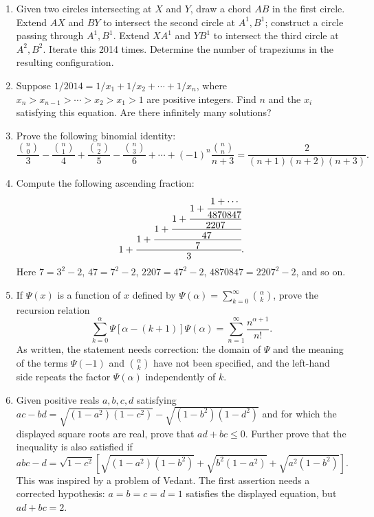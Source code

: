 \documentclass[11pt,a4paper]{article}
\begin{document}
\begin{enumerate}[label=\textbf{\arabic*.},itemsep=.75em]
\item Given two circles intersecting at $X$ and $Y$, draw a chord $AB$ in the first
circle. Extend $AX$ and $BY$ to intersect the second circle at $A^1,B^1$; construct a
circle passing through $A^1,B^1$. Extend $XA^1$ and $YB^1$ to intersect the third
circle at $A^2,B^2$. Iterate this 2014 times. Determine the number of trapeziums
in the resulting configuration.

\item Suppose $1/2014=1/x_1+1/x_2+\cdots+1/x_n$, where
$x_n>x_{n-1}>\cdots>x_2>x_1>1$ are positive integers. Find $n$ and the $x_i$ satisfying
this equation. Are there infinitely many solutions?

\item Prove the following binomial identity:
\[
\frac{\binom n0}{3}-\frac{\binom n1}{4}+\frac{\binom n2}{5}
-\frac{\binom n3}{6}+\cdots+(-1)^n\frac{\binom nn}{n+3}
=\frac2{(n+1)(n+2)(n+3)}.
\]

\item Compute the following ascending fraction:
\[
1+\cfrac{1+\cfrac{1+\cfrac{1+\cfrac{1+\cfrac{1+\cdots}{4870847}}{2207}}{47}}{7}}{3}.
\]
Here $7=3^2-2$, $47=7^2-2$, $2207=47^2-2$, $4870847=2207^2-2$, and so on.

\item If $\Psi(x)$ is a function of $x$ defined by
$\Psi(\alpha)=\sum_{k=0}^{\infty}\binom\alpha k$, prove the recursion relation
\[
\sum_{k=0}^{\alpha}\Psi[\alpha-(k+1)]\Psi(\alpha)
=\sum_{n=1}^{\infty}\frac{n^{\alpha+1}}{n!}.
\]
As written, the statement needs correction: the domain of $\Psi$ and the meaning
of the terms $\Psi(-1)$ and $\binom{\alpha}{k}$ have not been specified, and the
left-hand side repeats the factor $\Psi(\alpha)$ independently of $k$.

\setcounter{enumi}{18}
\item Given positive reals $a,b,c,d$ satisfying
$ac-bd=\sqrt{(1-a^2)(1-c^2)}-\sqrt{(1-b^2)(1-d^2)}$
and for which the displayed square roots are real, prove that $ad+bc\leq0$.
Further prove that the inequality is also satisfied if
\[
abc-d=\sqrt{1-c^2}\left[\sqrt{(1-a^2)(1-b^2)}
+\sqrt{b^2(1-a^2)}+\sqrt{a^2(1-b^2)}\right].
\]
This was inspired by a problem of Vedant.
The first assertion needs a corrected hypothesis: $a=b=c=d=1$ satisfies
the displayed equation, but $ad+bc=2$.


\end{enumerate}
\end{document}
